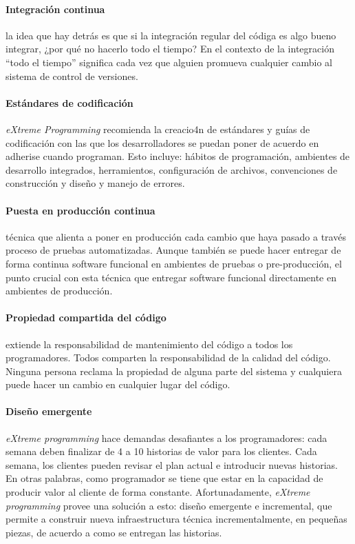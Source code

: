 \documentclass[journal]{IEEEtran}
\begin{document}
\paragraph{Integración continua}  la idea que hay detrás es que si la integración regular del códiga es algo bueno integrar, ¿por qué no hacerlo todo el tiempo? En el contexto de la integración ``todo el tiempo'' significa cada vez que alguien promueva cualquier cambio al sistema de control de versiones\cite{humble}. 

\paragraph{Estándares de codificación} \emph{eXtreme Programming} recomienda la creacio4n de estándares y guías de codificación con las que los desarrolladores se puedan poner de acuerdo en adherise cuando programan\cite{shore-warden}. Esto incluye: hábitos de programación, ambientes de desarrollo integrados, herramientos, configuración de archivos, convenciones de construcción y diseño y manejo de errores.

\paragraph{Puesta en producción continua} técnica que alienta a poner en producción cada cambio que haya pasado a través proceso de pruebas automatizadas. Aunque también se puede hacer entregar de forma continua software funcional en ambientes de pruebas o pre-producción, el punto crucial con esta técnica que entregar software funcional directamente en ambientes de producción\cite{humble}.

\paragraph{Propiedad compartida del código} extiende la responsabilidad de mantenimiento del código a todos los programadores. Todos comparten la responsabilidad de la calidad del código. Ninguna persona reclama la propiedad de alguna parte del sistema y cualquiera puede hacer un cambio en cualquier lugar del código\cite{shore-warden}.

\paragraph{Diseño emergente} \emph{eXtreme programming} hace demandas desafiantes a los programadores: cada semana deben finalizar de 4 a 10 historias de valor para los clientes. Cada semana, los clientes pueden revisar el plan actual e introducir nuevas historias. En otras palabras, como programador se tiene que estar en la capacidad de producir valor al cliente de forma constante. Afortunadamente, \emph{eXtreme programming} provee una solución a esto: diseño emergente e incremental, que permite a construir nueva infraestructura técnica incrementalmente, en pequeñas piezas, de acuerdo a como se entregan las historias\cite{shore-warden}.
\end{document}

